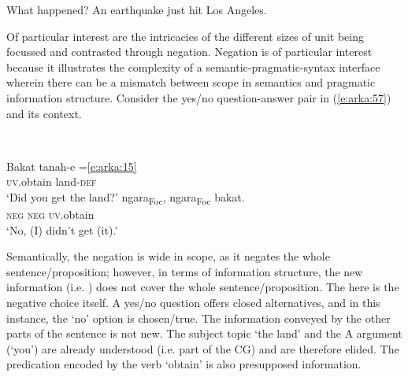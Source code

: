 \documentclass[output=paper
,modfonts
,nonflat]{langsci/langscibook}
\begin{document}
\begin{exe}
	\ex\label{e:arka:56}
	\begin{xlist}
		 \label{e:arka:56a} What happened?
		 \label{e:arka:56b} An earthquake just hit Los Angeles.
	\end{xlist}
\end{exe}

\noindent
Of particular interest are the intricacies of the different sizes of unit being focussed and contrasted through negation. Negation is of particular interest because it illustrates the complexity of a semantic-pragmatic-syntax interface wherein there can be a mismatch between scope in semantics and pragmatic information structure. Consider the yes/no question-answer pair in (\ref{e:arka:57}) and its context.

\begin{exe}
	\label{e:arka:57}\\
	\begin{xlist}
		\label{e:arka:57a}
		\gll Bakat   tanah-e{\USQMark}  {\USOParen}={\USOParen}\ref{e:arka:15}{\USCParen}{\USCParen}\\
		\textsc{uv}.obtain   land-\textsc{def}\\
		\glt ‘Did you get the land?’
		\label{e:arka:57b}
		\gll {\ob}ngara{\cb}\textsubscript{Foc},   {\ob}ngara{\cb}\textsubscript{Foc}   bakat.\\
		\phantom{[}\textsc{neg}  \phantom{[}\textsc{neg}    \textsc{uv}.obtain\\
		\glt‘No, (I) didn't get (it).’
	\end{xlist}
\end{exe}

\noindent
Semantically, the negation is wide in scope, as it negates the whole sentence/proposition; however, in terms of information structure, the new information (i.e. ) does not cover the whole sentence/proposition. The  here is the negative choice itself. A yes/no question offers closed alternatives, and in this instance, the ‘no’ option is chosen/true. The information conveyed by the other parts of the sentence is not new. The subject topic ‘the land’ and the A argument (‘you’) are already understood (i.e. part of the CG) and are therefore elided. The predication encoded by the  verb ‘obtain’ is also presupposed information. 
\end{document}
